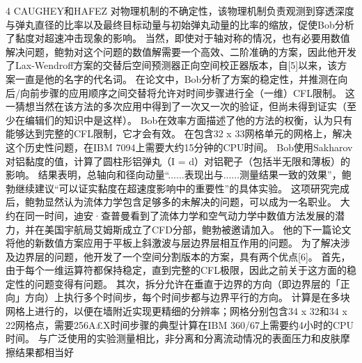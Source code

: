 \documentclass[UTF8,11pt,a4paper,openany,fontset=fandol]{ctexbook}
\begin{document}
4 CAUGHEY和HAFEZ 对物理机制的不确定性，该物理机制负责观测到穿透深度与弹丸直径的比率以及最终目标动量与初始弹丸动量的比率的缩放，促使Bob分析了黏度对超速冲击现象的影响。 当然，即使对于轴对称的情况，也有必要用数值解决问题，鲍勃对这个问题的数值解需要一个高效、二阶准确的方案，因此他开发了Lax-Wendroff方案的交替后空间预测器正向空间校正器版本，自[5]以来，该方案一直是他的名字的代名词。 在论文中，Bob分析了方案的稳定性，并推测在向后/向前步骤的应用顺序之间交替将允许对时间步骤进行全（一维）CFL限制。 这一猜想当然在该方法的多次应用中得到了一次又一次的验证，但尚未得到证实（至少在编辑们的知识中是这样）。 Bob在效率方面描述了他的方法的权衡，认为只有能够达到完整的CFL限制，它才会有效。 在包含32 x 33网格单元的网格上，解决这个历史性问题，在IBM 7094上需要大约15分钟的CPU时间。 Bob使用Sakharov对铝黏度的值，计算了圆柱形铝弹丸（I = d）对铝靶子（包括半无限和薄板）的影响。 结果表明，总轴向和径向动量“......表现出与......测量结果一致的效果”，鲍勃继续建议“可以证实黏度在超速度影响中的重要性”的具体实验。 这项研究完成后，鲍勃显然认为流体力学包含足够多的未解决的问题，可以成为一名职业。 大约在同一时间，迪安·查普曼看到了流体力学和空气动力学中数值方法发展的潜力，并在美国宇航局艾姆斯成立了CFD分部，鲍勃被邀请加入。 他的下一篇论文将他的新数值方案应用于平板上斜激波与层边界层相互作用的问题。 为了解决涉及边界层的问题，他开发了一个空间分割版本的方案，具有两个优点[6]。 首先，由于每个一维运算符都保持稳定，直到完整的CFL极限，因此之前关于这方面的稳定性的问题变得有问题。 其次，拆分允许在垂直于边界的方向（即边界层的「正向」方向）上执行多个时间步，每个时间步都与边界平行的方向。 计算是在多块网格上进行的，以便在墙附近实现更精细的分辨率；网格分别包含34 x 32和34 x 22网格点，需要256A£X时间步骤的典型计算在IBM 360/67上需要约4小时的CPU时间。 与广泛使用的实验测量相比，非分离和分离流动情况的表面压力和皮肤摩擦结果都相当好
\end{document}
